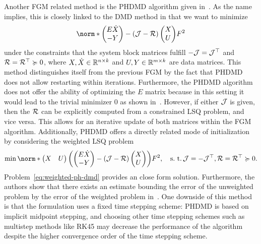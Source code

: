 Another \ac{FGM} related method is the \ac{PHDMD} algorithm given in~\cite{Morandin2023}.
As the name implies, this is closely linked to the \ac{DMD} method in that we want to minimize
\begin{equation}\label{eq:ph-dmd-minimization-problem}
    \norm*{\begin{pmatrix}
        E \dot{X} \\
        -Y
    \end{pmatrix} - (\mcl{J} - \mcl{R}) \begin{pmatrix}
        X \\
        U
    \end{pmatrix}}{F}^2
\end{equation}
under the constraints that the system block matrices fulfill $-\mathcal{J} = \mathcal{J}^{\top}$ and $\mathcal{R} = \mathcal{R}^{\top} \succcurlyeq 0$, where $X, \dot{X} \in \mathbb{R}^{n \times k}$ and $U, Y \in \mathbb{R}^{m \times k}$ are data matrices.
This method distinguishes itself from the previous \ac{FGM} by the fact that \ac{PHDMD} does not allow restarting within iterations.
Furthermore, the \ac{PHDMD} algorithm does not offer the ability of optimizing the $E$ matrix because in this setting it would lead to the trivial minimizer $0$ as shown in~\cite[Remark~3.3]{Morandin2023}.
However, if either $\mathcal{J}$ is given, then the $\mathcal{R}$ can be explicitly computed from a constrained \ac{LSQ} problem, and vice versa.
This allows for an iterative update of both matrices within the \ac{FGM} algorithm.
Additionally, \ac{PHDMD} offers a directly related mode of initialization by considering the weighted \ac{LSQ} problem
\begin{equation}\label{eq:weighted-ph-dmd}
    \min \norm*{\begin{pmatrix}
        X & U
    \end{pmatrix} \left( \begin{pmatrix}
        E \dot{X} \\
        -Y
    \end{pmatrix} - (\mcl{J} - \mcl{R}) \begin{pmatrix}
        X \\
        U
    \end{pmatrix} \right)}{F}^2,\quad \suchthat \mcl{J} = - \mcl{J}\trans, \mcl{R} = \mcl{R}\trans \succcurlyeq 0.
\end{equation}
Problem~\ref{eq:weighted-ph-dmd} provides an close form solution.
Furthermore, the authors show that there exists an estimate bounding the error of the unweighted problem by the error of the weighted problem in~\cite[Lemma~3.11]{Morandin2023}.
One downside of this method is that the formulation uses a fixed time stepping scheme: \ac{PHDMD} is based on implicit midpoint stepping, and choosing other time stepping schemes such as multistep methods like RK45 may decrease the performance of the algorithm despite the higher convergence order of the time stepping scheme.

